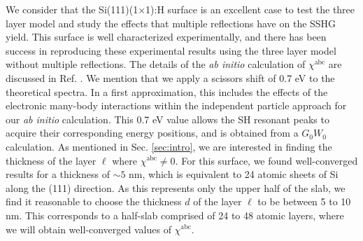 \documentclass[aps,prb,10pt,showpacs,letterpaper,twocolumn]{revtex4-1}
\begin{document}
We consider that the Si(111)(1$\times$1):H surface is an excellent case to test
the three layer model and study the effects that multiple reflections have on
the SSHG yield. This surface is well characterized
experimentally,\cite{mitchellSS01, mejiaPRB02, bergfeldPRL04} and there has been
success in reproducing these experimental results using the three layer model
without multiple reflections.\cite{andersonPRB16} The details of the \emph{ab
initio} calculation of $\chi^{\mathrm{abc}}$ are discussed in Ref.
. We mention that we apply a scissors shift of 0.7 eV
to the theoretical spectra. In a first approximation, this includes the effects
of the electronic many-body interactions within the independent particle
approach for our \emph{ab initio} calculation. This 0.7 eV value allows the SH
resonant peaks to acquire their corresponding energy positions, and is obtained
from a $G_{0}W_{0}$ calculation.\cite{andersonPRB16, liPRB10} As mentioned in
Sec. \ref{sec:intro}, we are interested in finding the thickness of the layer
$\ell$ where $\chi^{\mathrm{abc}} \ne 0$. For this surface, we found
well-converged results for a thickness of $\sim 5$ nm, which is equivalent to 24
atomic sheets of Si along the (111) direction. As this represents only the upper
half of the slab, we find it reasonable to choose the thickness $d$ of the layer
$\ell$ to be between 5 to 10 nm. This corresponds to a half-slab comprised of 24
to 48 atomic layers, where we will obtain well-converged values of
$\chi^{\mathrm{abc}}$.
\end{document}
